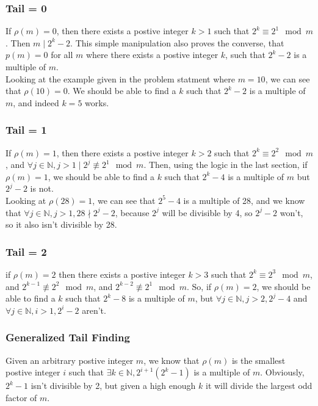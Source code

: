 \documentclass{article}
\begin{document}
  \subsubsection{Tail = 0}
  If $\rho (m) = 0$, then there exists a postive integer $k > 1$ such that $2^k \equiv 2^1 \mod m$. Then $m \mid 2^k - 2$. This simple manipulation also proves the converse, that $p(m) = 0$ for all $m$ where there exists a postive integer $k$, such that $2^k - 2$ is a multiple of $m$.\\

  Looking at the example given in the problem statment where $m=10$, we can see that $\rho(10) = 0$. We should be able to find a $k$ such that $2^k -2$ is a multiple of $m$, and indeed $k=5$ works.
  \subsubsection{Tail = 1}
  If $\rho (m) = 1$, then there exists a postive integer $k > 2$ such that $2^k \equiv 2^2 \mod m$, and $\forall j \in \mathbb{N}, j > 1 \mid 2^{j} \not\equiv 2^1 \mod m$. Then, using the logic in the last section, if $\rho(m) = 1$, we should be able to find a $k$ such that $2^k - 4$ is a multiple of $m$ but $2^j - 2$ is not.\\

  Looking at $\rho(28) = 1$, we can see that $2^5 - 4$ is a multiple of 28, and we know that $\forall j \in \mathbb{N}, j > 1, 28 \nmid 2^j - 2$, because $2^j$ will be divisible by 4, so $2^j - 2$ won't, so it also isn't divisible by 28. 
  \subsubsection{Tail = 2}
  if $\rho (m) = 2$ then there exists a postive integer $k > 3$ such that $2^k \equiv 2^3 \mod m$, and $2^{k-1} \not\equiv 2^2 \mod m$, and $2^{k-2} \not\equiv 2^1 \mod m$. So, if $\rho(m) = 2$, we should be able to find a $k$ such that $2^k - 8$ is a multiple of $m$, but $\forall j \in \mathbb{N}, j > 2, 2^{j} - 4$ and $\forall j \in \mathbb{N}, i > 1, 2^{i} - 2$ aren't.
  \subsubsection{Generalized Tail Finding}
  Given an arbitrary postive integer $m$, we know that $\rho(m)$ is the smallest postive integer $i$ such that $\exists k \in \mathbb{N}, 2^{i+1}(2^k - 1)$ is a multiple of $m$. Obviously, $2^k-1$ isn't divisible by 2, but given a high enough $k$ it will divide the largest odd factor of $m$.\\
\end{document}

